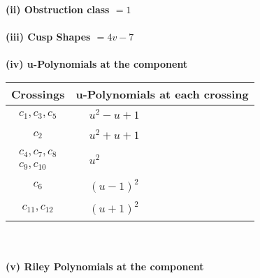 \documentclass[1p]{elsarticle_modified}
\theoremstyle{definition}
\begin{document}
\flushleft \textbf{(ii) Obstruction class $= 1$}\\~\\
\flushleft \textbf{(iii) Cusp Shapes $= 4 v-7$}\\~\\
\newpage\renewcommand{\arraystretch}{1}
\flushleft \textbf{(iv) u-Polynomials at the component}\newline \\
\begin{tabular}{m{50pt}|m{274pt}}
Crossings & \hspace{64pt}u-Polynomials at each crossing \\
\hline $$\begin{aligned}c_{1},c_{3},c_{5}\end{aligned}$$&$\begin{aligned}
&u^2- u+1
\end{aligned}$\\
\hline $$\begin{aligned}c_{2}\end{aligned}$$&$\begin{aligned}
&u^2+u+1
\end{aligned}$\\
\hline $$\begin{aligned}c_{4},c_{7},c_{8}\\c_{9},c_{10}\end{aligned}$$&$\begin{aligned}
&u^2
\end{aligned}$\\
\hline $$\begin{aligned}c_{6}\end{aligned}$$&$\begin{aligned}
&(u-1)^2
\end{aligned}$\\
\hline $$\begin{aligned}c_{11},c_{12}\end{aligned}$$&$\begin{aligned}
&(u+1)^2
\end{aligned}$\\
\hline
\end{tabular}\\~\\
\newpage\renewcommand{\arraystretch}{1}
\flushleft \textbf{(v) Riley Polynomials at the component}\newline \\
\end{document}
